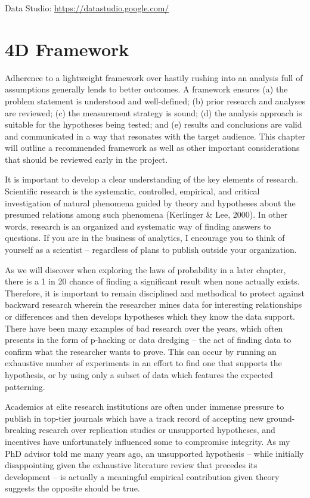 \documentclass[]{book}
\begin{document}
Data Studio: \url{https://datastudio.google.com/}

\hypertarget{d-framework}{%
\section{4D Framework}\label{d-framework}}

Adherence to a lightweight framework over hastily rushing into an analysis full of assumptions generally lends to better outcomes. A framework ensures (a) the problem statement is understood and well-defined; (b) prior research and analyses are reviewed; (c) the measurement strategy is sound; (d) the analysis approach is suitable for the hypotheses being tested; and (e) results and conclusions are valid and communicated in a way that resonates with the target audience. This chapter will outline a recommended framework as well as other important considerations that should be reviewed early in the project.

It is important to develop a clear understanding of the key elements of research. Scientific research is the systematic, controlled, empirical, and critical investigation of natural phenomena guided by theory and hypotheses about the presumed relations among such phenomena (Kerlinger \& Lee, 2000). In other words, research is an organized and systematic way of finding answers to questions. If you are in the business of analytics, I encourage you to think of yourself as a scientist -- regardless of plans to publish outside your organization.

As we will discover when exploring the laws of probability in a later chapter, there is a 1 in 20 chance of finding a significant result when none actually exists. Therefore, it is important to remain disciplined and methodical to protect against backward research wherein the researcher mines data for interesting relationships or differences and then develops hypotheses which they know the data support. There have been many examples of bad research over the years, which often presents in the form of p-hacking or data dredging -- the act of finding data to confirm what the researcher wants to prove. This can occur by running an exhaustive number of experiments in an effort to find one that supports the hypothesis, or by using only a subset of data which features the expected patterning.

Academics at elite research institutions are often under immense pressure to publish in top-tier journals which have a track record of accepting new ground-breaking research over replication studies or unsupported hypotheses, and incentives have unfortunately influenced some to compromise integrity. As my PhD advisor told me many years ago, an unsupported hypothesis -- while initially disappointing given the exhaustive literature review that precedes its development -- is actually a meaningful empirical contribution given theory suggests the opposite should be true.
\end{document}
